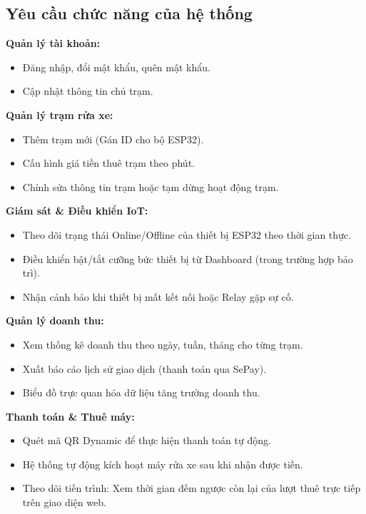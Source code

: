 \documentclass[../main.tex]{subfiles}
\begin{document}
\subsection{Yêu cầu chức năng của hệ thống}

\textbf{Quản lý tài khoản:}
\begin{itemize}
    \item Đăng nhập, đổi mật khẩu, quên mật khẩu.
    \item Cập nhật thông tin chủ trạm.
\end{itemize}

\textbf{Quản lý trạm rửa xe:}
\begin{itemize}
    \item Thêm trạm mới (Gán ID cho bộ ESP32).
    \item Cấu hình giá tiền thuê trạm theo phút.
    \item Chỉnh sửa thông tin trạm hoặc tạm dừng hoạt động trạm.
\end{itemize}

\textbf{Giám sát \& Điều khiển IoT:}
\begin{itemize}
    \item Theo dõi trạng thái Online/Offline của thiết bị ESP32 theo thời gian thực.
    \item Điều khiển bật/tắt cưỡng bức thiết bị từ Dashboard (trong trường hợp bảo trì).
    \item Nhận cảnh báo khi thiết bị mất kết nối hoặc Relay gặp sự cố.
\end{itemize}

\textbf{Quản lý doanh thu:}
\begin{itemize}
    \item Xem thống kê doanh thu theo ngày, tuần, tháng cho từng trạm.
    \item Xuất báo cáo lịch sử giao dịch (thanh toán qua SePay).
    \item Biểu đồ trực quan hóa dữ liệu tăng trưởng doanh thu.
\end{itemize}

\textbf{Thanh toán \& Thuê máy:}
\begin{itemize}
    \item Quét mã QR Dynamic để thực hiện thanh toán tự động.
    \item Hệ thống tự động kích hoạt máy rửa xe sau khi nhận được tiền.
    \item Theo dõi tiến trình: Xem thời gian đếm ngược còn lại của lượt thuê trực tiếp trên giao diện web.
\end{itemize}
\end{document}
